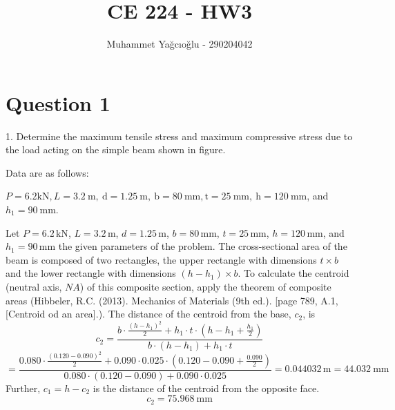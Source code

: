 \documentclass[12pt]{article}
\title{\vspace{-1cm}CE 224 - HW3}
\author{Muhammet Yağcıoğlu - 290204042}
\begin{document}
\maketitle\thispagestyle{fancy}
\pagestyle{fancy}
\tableofcontents
\newpage



\section*{Question 1}
\begin{q}
1. Determine the maximum tensile stress and maximum compressive stress due to the load acting on the simple beam shown in figure.

Data are as follows:

\(P=6.2 \mathrm{kN}, L=3.2 \mathrm{~m}, \mathrm{~d}=1.25 \mathrm{~m}, \mathrm{~b}=80 \mathrm{~mm}, \mathrm{t}=25 \mathrm{~mm}, \mathrm{~h}=120 \mathrm{~mm}\), and \(h_1=90 \mathrm{~mm}\).

\end{q}


\begin{figure}[!ht]
    \centering
    \caption{}
    \label{fig:enter-label}
\end{figure}

Let \( P = 6.2 \, \text{kN} \), \( L = 3.2 \, \text{m} \), \( d = 1.25 \, \text{m} \), \( b = 80 \, \text{mm} \), \( t = 25 \, \text{mm} \), \( h = 120 \, \text{mm} \), and \( h_1 = 90 \, \text{mm} \) the given parameters of the problem. The cross-sectional area of the beam is composed of two rectangles, the upper rectangle with dimensions \( t \times b \) and the lower rectangle with dimensions \( (h - h_1) \times b \). To calculate the centroid (neutral axis, $NA$) of this composite section, apply the theorem of composite areas (Hibbeler, R.C. (2013). Mechanics of Materials (9th ed.). [page 789, A.1, [Centroid od an area].). The distance of the centroid from the base, \( c_2 \), is
\[
c_2 = \frac{b \cdot \frac{(h - h_1)^2}{2} + h_1 \cdot t \cdot \left( h - h_1 + \frac{h_1}{2} \right)}{b \cdot (h - h_1) + h_1 \cdot t}
\]
\[= \frac{0.080 \cdot \frac{(0.120 - 0.090)^2}{2} + 0.090 \cdot 0.025 \cdot \left( 0.120 - 0.090 + \frac{0.090}{2} \right)}{0.080 \cdot (0.120 - 0.090) + 0.090 \cdot 0.025} = 0.044032 \, \text{m} = 44.032 \mathrm{~mm} \]
Further, \( c_1 = h - c_2 \) is the distance of the centroid from the opposite face.
\[c_2=75.968 \mathrm{~mm}\]
\end{document}

